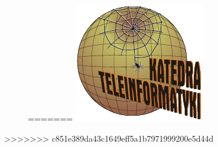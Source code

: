 \begin{figure}[ht]
\begin{minipage}[b]{0.33\linewidth}
\begin{figure}[ht]
\end{figure}
=======
\includegraphics[scale=0.6]{logo-kti}
\end{minipage}
\end{figure}

>>>>>>> c851e389da43c1649eff5a1b7971999200e5d44d
\newpage

